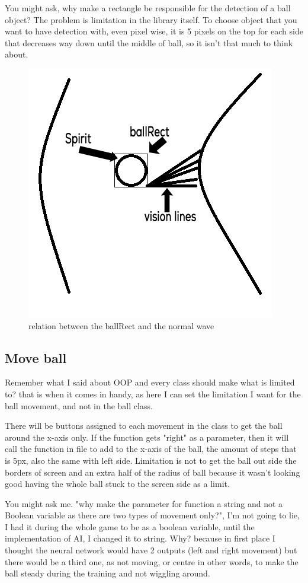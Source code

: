 You might ask, why make a rectangle be responsible for the detection of a ball object? The problem is limitation in the library itself. To choose object that you want to have detection with, even pixel wise, it is 5 pixels on the top for each side that decreases way down until the middle of ball, so it isn't that much to think about.

\begin{figure}[H]
	\centering
	\includegraphics[width=0.7\linewidth]{usedImages/colliison}
	\caption{relation between the ballRect and the normal wave}
	\label{fig:colliison}
\end{figure}


\subsection{Move ball}
Remember what I said about OOP and every class should make what is limited to? that is when it comes in handy, as here I can set the limitation I want for the ball movement, and not in the ball class.

There will be buttons assigned to each movement in the class to get the ball around the x-axis only. If the function gets "right" as a parameter, then it will call the  function in  file to add to the x-axis of the ball, the amount of steps that is 5px, also the same with left side. Limitation is not to get the ball out side the borders of screen and an extra half of the radius of ball because it wasn't looking good having the whole ball stuck to the screen side as a limit.

You might ask me. "why make the parameter for function a string and not a Boolean variable as there are two types of movement only?", I'm not going to lie, I had it during the whole game to be as a boolean variable, until the implementation of AI, I changed it to string. Why? because in first place I thought the neural network would have 2 outputs (left and right movement) but there would be a third one, as not moving, or centre in other words, to make the ball steady during the training and not wiggling around.

